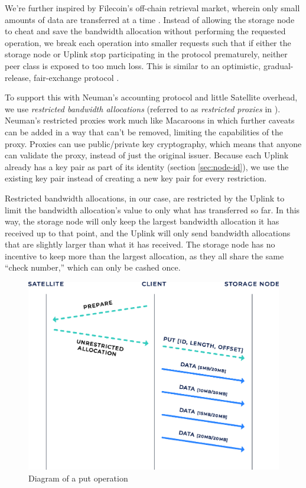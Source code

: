 \documentclass[8pt,fleqn,openany]{book}
\begin{document}
We're further inspired by Filecoin's off-chain retrieval market,
wherein only small amounts of data are transferred at a time \cite{filecoin}.
Instead of allowing the storage node to cheat and save the bandwidth allocation
without performing the requested operation,
we break each operation into smaller requests such that if either the storage
node or Uplink stop participating in the protocol prematurely, neither peer
class is exposed to too much loss. This is similar to an optimistic, gradual-release, fair-exchange protocol \cite{schneier}.

To support this with Neuman's accounting protocol and little Satellite overhead,
we use {\em restricted bandwidth allocations}
(referred to as {\em restricted proxies} in \cite{proxy-accounting}).
Neuman's restricted proxies work much like Macaroons
\cite{macaroons} in which further caveats can be added in a way that can't be
removed, limiting the capabilities of the proxy. Proxies
can use public/private key cryptography, which means that anyone can validate
the proxy, instead of just the original issuer.
Because each Uplink already has a key pair as part of its identity
(section \ref{sec:node-id}), we use the existing key pair instead of
creating a new key pair for every restriction.

Restricted bandwidth allocations, in our case, are restricted by the Uplink to
limit the bandwidth allocation's value to only what has transferred so far.
In this way, the storage node will only keep the largest bandwidth allocation
it has received up to that point, and the Uplink will only send bandwidth allocations
that are slightly larger than what it has received.
The storage node has no incentive to keep more than the largest allocation, as
they all share the same ``check number,'' which can only be cashed once.

\begin{figure}[!htbp]
\centering
\includegraphics[height=.4\textheight]{images/put.eps}
\caption{Diagram of a put operation}
\label{fig:bap-put}
\end{figure}
\end{document}
